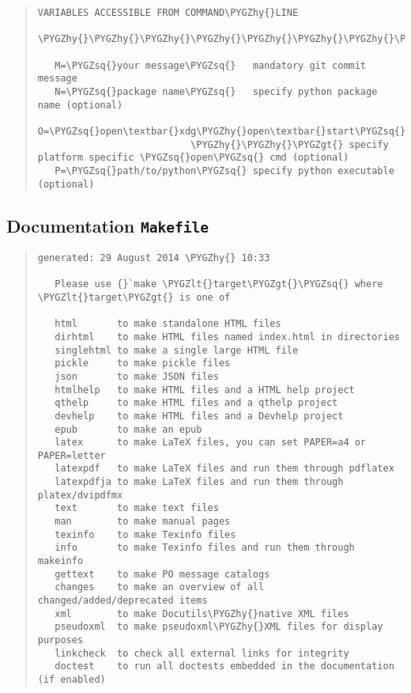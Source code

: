 \documentclass[letterpaper,10pt,english]{sphinxmanual}
\def\PYGZlt{\char`\<}
\def\PYGZgt{\char`\>}
\def\PYGZhy{\char`\-}
\def\PYGZsq{\char`\'}
\begin{document}
\begin{quote}
\begin{Verbatim}[commandchars=\\\{\}]
   VARIABLES ACCESSIBLE FROM COMMAND\PYGZhy{}LINE
   \PYGZhy{}\PYGZhy{}\PYGZhy{}\PYGZhy{}\PYGZhy{}\PYGZhy{}\PYGZhy{}\PYGZhy{}\PYGZhy{}\PYGZhy{}\PYGZhy{}\PYGZhy{}\PYGZhy{}\PYGZhy{}\PYGZhy{}\PYGZhy{}\PYGZhy{}\PYGZhy{}\PYGZhy{}\PYGZhy{}\PYGZhy{}\PYGZhy{}\PYGZhy{}\PYGZhy{}\PYGZhy{}\PYGZhy{}\PYGZhy{}\PYGZhy{}\PYGZhy{}\PYGZhy{}\PYGZhy{}\PYGZhy{}\PYGZhy{}\PYGZhy{}\PYGZhy{}\PYGZhy{}\PYGZhy{}\PYGZhy{}

   M=\PYGZsq{}your message\PYGZsq{}   mandatory git commit message
   N=\PYGZsq{}package name\PYGZsq{}   specify python package name (optional)
   O=\PYGZsq{}open\textbar{}xdg\PYGZhy{}open\textbar{}start\PYGZsq{}
                           \PYGZhy{}\PYGZhy{}\PYGZgt{} specify platform specific \PYGZsq{}open\PYGZsq{} cmd (optional)
   P=\PYGZsq{}path/to/python\PYGZsq{} specify python executable (optional)
\end{Verbatim}
\end{quote}


\subsection{Documentation \texttt{Makefile}}
\label{contributing:documentation-makefile}\begin{quote}

\begin{Verbatim}[commandchars=\\\{\}]
generated: 29 August 2014 \PYGZhy{} 10:33

   Please use {}`make \PYGZlt{}target\PYGZgt{}\PYGZsq{} where \PYGZlt{}target\PYGZgt{} is one of

   html       to make standalone HTML files
   dirhtml    to make HTML files named index.html in directories
   singlehtml to make a single large HTML file
   pickle     to make pickle files
   json       to make JSON files
   htmlhelp   to make HTML files and a HTML help project
   qthelp     to make HTML files and a qthelp project
   devhelp    to make HTML files and a Devhelp project
   epub       to make an epub
   latex      to make LaTeX files, you can set PAPER=a4 or PAPER=letter
   latexpdf   to make LaTeX files and run them through pdflatex
   latexpdfja to make LaTeX files and run them through platex/dvipdfmx
   text       to make text files
   man        to make manual pages
   texinfo    to make Texinfo files
   info       to make Texinfo files and run them through makeinfo
   gettext    to make PO message catalogs
   changes    to make an overview of all changed/added/deprecated items
   xml        to make Docutils\PYGZhy{}native XML files
   pseudoxml  to make pseudoxml\PYGZhy{}XML files for display purposes
   linkcheck  to check all external links for integrity
   doctest    to run all doctests embedded in the documentation (if enabled)
\end{Verbatim}
\end{quote}
\end{document}
